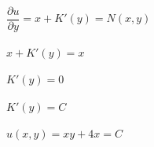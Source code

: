 \begin{enumerate}[1.]
		\begin{math} \dfrac{\partial u}{\partial y} = x + K'(y) = N(x, y) \end{math} \\ \\
		\begin{math} x + K'(y) = x \end{math} \\ \\
		\begin{math} K'(y) = 0 \end{math} \\ \\
		\begin{math} K'(y) = C \end{math} \\ \\
		\begin{math} u(x, y) = xy + 4x = C \end{math}


\end{enumerate}
